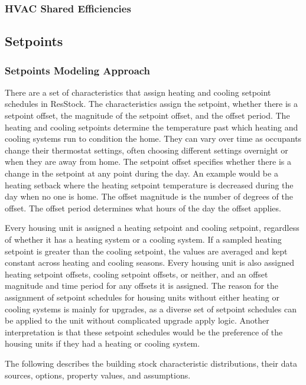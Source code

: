 \subsubsection{HVAC Shared Efficiencies}


\subsection{Setpoints} \label{sec:setpoints}
\subsubsection{Setpoints Modeling Approach}
There are a set of characteristics that assign heating and cooling setpoint schedules in ResStock. The characteristics assign the setpoint, whether there is a setpoint offset, the magnitude of the setpoint offset, and the offset period. The heating and cooling setpoints determine the temperature past which heating and cooling systems run to condition the home. They can vary over time as occupants change their thermostat settings, often choosing different settings overnight or when they are away from home. The setpoint offset specifies whether there is a change in the setpoint at any point during the day. An example would be a heating setback where the heating setpoint temperature is decreased during the day when no one is home. The offset magnitude is the number of degrees of the offset. The offset period determines what hours of the day the offset applies.

Every housing unit is assigned a heating setpoint and cooling setpoint, regardless of whether it has a heating system or a cooling system. If a sampled heating setpoint is greater than the cooling setpoint, the values are averaged and kept constant across heating and cooling seasons. Every housing unit is also assigned heating setpoint offsets, cooling setpoint offsets, or neither, and an offset magnitude and time period for any offsets it is assigned. The reason for the assignment of setpoint schedules for housing units without either heating or cooling systems is mainly for upgrades, as a diverse set of setpoint schedules can be applied to the unit without complicated upgrade apply logic. Another interpretation is that these setpoint schedules would be the preference of the housing units if they had a heating or cooling system.

The following describes the building stock characteristic distributions, their data sources, options, property values, and assumptions.

